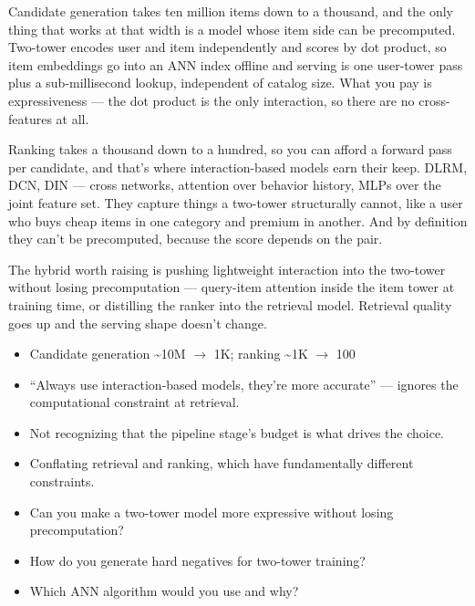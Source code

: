 \documentclass[10pt,twoside]{book}
\newcommand{\lab}[1]{\par\vspace{5pt}\noindent{\sffamily\footnotesize\bfseries\color{accent}#1}\par\vspace{1pt}}
\newcommand{\flab}[1]{\par\vspace{5pt}\noindent{\sffamily\footnotesize\bfseries\color{flag}#1}\par\vspace{1pt}}
\begin{document}
Candidate generation takes ten million items down to a thousand, and the only thing that works at that width is a model whose item side can be precomputed. Two-tower encodes user and item independently and scores by dot product, so item embeddings go into an ANN index offline and serving is one user-tower pass plus a sub-millisecond lookup, independent of catalog size. What you pay is expressiveness --- the dot product is the only interaction, so there are no cross-features at all.\par\vspace{3pt}
Ranking takes a thousand down to a hundred, so you can afford a forward pass per candidate, and that's where interaction-based models earn their keep. DLRM, DCN, DIN --- cross networks, attention over behavior history, MLPs over the joint feature set. They capture things a two-tower structurally cannot, like a user who buys cheap items in one category and premium in another. And by definition they can't be precomputed, because the score depends on the pair.\par\vspace{3pt}
The hybrid worth raising is pushing lightweight interaction into the two-tower without losing precomputation --- query-item attention inside the item tower at training time, or distilling the ranker into the retrieval model. Retrieval quality goes up and the serving shape doesn't change.\par\vspace{3pt}
\lab{Numbers}
\begin{itemize}
\item Candidate generation \textasciitilde{}10M $\to$ 1K; ranking \textasciitilde{}1K $\to$ 100
\end{itemize}
\flab{Loses the signal}
\begin{itemize}
\item ``Always use interaction-based models, they're more accurate'' --- ignores the computational constraint at retrieval.
\item Not recognizing that the pipeline stage's budget is what drives the choice.
\item Conflating retrieval and ranking, which have fundamentally different constraints.
\end{itemize}
\lab{Then they ask}
\begin{itemize}
\item Can you make a two-tower model more expressive without losing precomputation?
\item How do you generate hard negatives for two-tower training?
\item Which ANN algorithm would you use and why?
\end{itemize}
\end{document}
